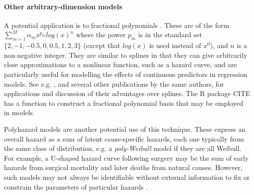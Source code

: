 \documentclass[nojss,nofooter]{jss}
\begin{document}
\paragraph{Other arbitrary-dimension models}

A potential application is to fractional polynomials
\citep{royston1994regression}. These are of the form $\sum_{m=1}^M
\alpha_m x^{p_m} log(x)^n$ where the power $p_m$ is in the standard
set $\{2,-1,-0.5,0,0.5,1,2,3\}$ (except that $log(x)$ is used instead
of $x^0$), and $n$ is a non-negative integer. They are similar to
splines in that they can give arbitrarily close approximations to a
nonlinear function, such as a hazard curve, and are particularly
useful for modelling the effects of continuous predictors in
regression models.  See e.g. \citet{sauerbrei2007selection}, and
several other publications by the same authors, for applications and
discussion of their advantages over splines.  The R package
 CITE has a function to construct a fractional polynomial
basis that may be employed in  models.

Polyhazard models \citep{polyhazard} are another potential use of this
technique.  These express an overall hazard as a sum of latent
cause-specific hazards, each one typically from the same class of
distribution, e.g. a \emph{poly-Weibull} model if they are all
Weibull.  For example, a U-shaped hazard curve following surgery may
be the sum of early hazards from surgical mortality and later deaths
from natural causes.  However, such models may not always be
identifiable without external information to fix or constrain the
parameters of particular hazards \citep{demiris2011survival}.
\end{document}
